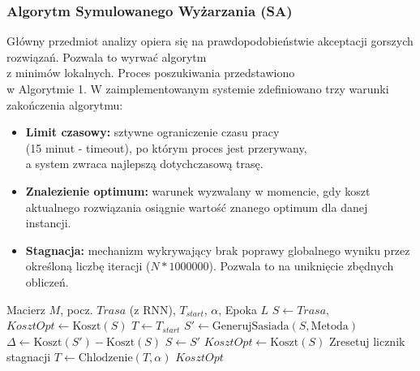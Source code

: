 \documentclass[conference]{IEEEtran}
\begin{document}
            \subsubsection{Algorytm Symulowanego Wyżarzania (SA)}
                Główny przedmiot analizy opiera się na prawdopodobieństwie akceptacji gorszych rozwiązań. Pozwala to wyrwać algorytm \\ z minimów lokalnych. Proces poszukiwania przedstawiono \\ w Algorytmie 1. W zaimplementowanym systemie zdefiniowano trzy warunki zakończenia algorytmu:
                \begin{itemize}
                    \item \textbf{Limit czasowy:} sztywne ograniczenie czasu pracy \\ (15 minut - timeout), po którym proces jest przerywany, \\ a system zwraca najlepszą dotychczasową trasę.
                    \item \textbf{Znalezienie optimum:} warunek wyzwalany w momencie, gdy koszt aktualnego rozwiązania osiągnie wartość znanego optimum dla danej instancji.
                    \item \textbf{Stagnacja:} mechanizm wykrywający brak poprawy globalnego wyniku przez określoną liczbę iteracji ($N * 1000000$). Pozwala to na uniknięcie zbędnych obliczeń.
                \end{itemize}
                \begin{algorithm}
                    \caption{Simulated Annealing}
                    \begin{algorithmic}[1]
                    \REQUIRE Macierz $M$, pocz. $Trasa$ (z RNN), $T_{start}$, $\alpha$, Epoka $L$
                    \STATE $S \leftarrow Trasa$, $KosztOpt \leftarrow \text{Koszt}(S)$
                    \STATE $T \leftarrow T_{start}$
                            \STATE $S' \leftarrow \text{GenerujSasiada}(S, \text{Metoda})$
                            \STATE $\Delta \leftarrow \text{Koszt}(S') - \text{Koszt}(S)$
                                \STATE $S \leftarrow S'$
                                    \STATE $KosztOpt \leftarrow \text{Koszt}(S)$
                                    \STATE Zresetuj licznik stagnacji
                                \ENDIF
                            \ENDIF
                        \ENDFOR
                        \STATE $T \leftarrow \text{Chlodzenie}(T, \alpha)$
                    \ENDWHILE
                    \RETURN $KosztOpt$
                    \end{algorithmic}
                \end{algorithm}
\end{document}
